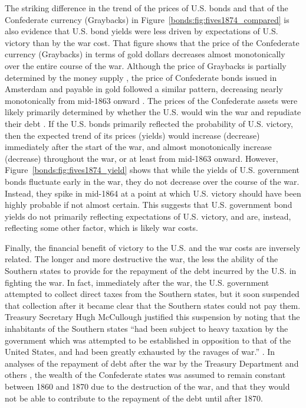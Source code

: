 The striking difference in the trend of the prices of U.S. bonds and that of the Confederate currency (Graybacks) in Figure~\ref{bonds:fig:fives1874_compared} is also evidence that U.S. bond yields were less driven by expectations of U.S. victory than by the war cost.
That figure shows that the price of the Confederate currency (Graybacks) in terms of gold dollars decreases almost monotonically over the entire course of the war.
Although the price of Graybacks is partially determined by the money supply \parencite{BurdekinWeidenmier2001}, the price of Confederate bonds issued in Amsterdam and payable in gold followed a similar pattern, decreasing nearly monotonically from mid-1863 onward \parencite{HaberMitchenerOosterlinckEtAl2015}.
The prices of the Confederate assets were likely primarily determined by whether the U.S. would win the war and repudiate their debt \parencite{HaberMitchenerOosterlinckEtAl2015}.
If the U.S. bonds primarily reflected the probability of U.S. victory, then the expected trend of its prices (yields) would increase (decrease) immediately after the start of the war, and almost monotonically increase (decrease) throughout the war, or at least from mid-1863 onward.
However, Figure~\ref{bonds:fig:fives1874_yield} shows that while the yields of U.S. government bonds fluctuate early in the war, they do not decrease over the course of the war.
Instead, they spike in mid-1864 at a point at which U.S. victory should have been highly probable if not almost certain.
This suggests that U.S. government bond yields do not primarily reflecting expectations of U.S. victory, and are, instead, reflecting some other factor, which is likely war costs.

Finally, the financial benefit of victory to the U.S. and the war costs are inversely related.
The longer and more destructive the war, the less the ability of the Southern states to provide for the repayment of the debt incurred by the U.S. in fighting the war.
In fact, immediately after the war, the U.S. government attempted to collect direct taxes from the Southern states, but it soon suspended that collection after it became clear that the Southern states could not pay them.
Treasury Secretary Hugh McCullough justified this suspension by noting that the inhabitants of the Southern states ``had been subject to heavy taxation by the government which was attempted to be established in opposition to that of the United States, and had been greatly exhausted by the ravages of war.'' \parencite[29]{Treasury1865}.
In analyses of the repayment of debt after the war by the Treasury Department and others \parencites{Elder1865}{Treasury1865}{Walker1865a}, the wealth of the Confederate states was assumed to remain constant between 1860 and 1870 due to the destruction of the war, and that they would not be able to contribute to the repayment of the debt until after 1870.

